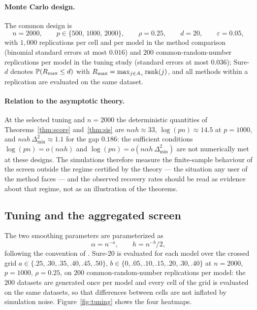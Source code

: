 \paragraph{Monte Carlo design.}
The common design is
\[
 n=2000,\qquad p\in\{500,\,1000,\,2000\},\qquad \rho=0.25,
 \qquad d=20,\qquad \varepsilon=0.05,
\]
with $1{,}000$ replications per cell and per model in the method
comparison (binomial standard errors at most $0.016$) and $200$
common-random-number replications per model in the tuning study
(standard errors at most $0.036$); Sure-$d$ denotes
$\mathbb P(R_{\max}\le d)$ with $R_{\max}=\max_{j\in A_\gamma}\mathrm{rank}(j)$,
and all methods within a replication are evaluated on the same dataset.

\paragraph{Relation to the asymptotic theory.}
At the selected tuning and $n=2000$ the deterministic quantities of
Theorems~\ref{thm:score} and~\ref{thm:sis} are $n\alpha h\approx33$,
$\log(pn)\approx14.5$ at $p=1000$, and
$n\alpha h\,\Delta_{\min}^2\approx1.1$ for the gap $0.186$: the
sufficient conditions $\log(pn)=o(n\alpha h)$ and
$\log(pn)=o(n\alpha h\,\Delta_{\min}^2)$ are not numerically met at
these designs. The simulations therefore measure the finite-sample
behaviour of the screen outside the regime certified by the theory ---
the situation any user of the method faces --- and the observed
recovery rates should be read as evidence about that regime, not as an
illustration of the theorems.

\subsection{Tuning and the aggregated screen}\label{sec:tuning}

The two smoothing parameters are parameterized as
\[
 \alpha=n^{-a},\qquad h=n^{-b}/2,
\]
following the convention of \citet{gardesPodgorny2025}. Sure-20 is
evaluated for each model over the crossed grid
$a\in\{.25,.30,.35,.40,.45,.50\}$,
$b\in\{0,.05,.10,.15,.20,.30,.40\}$ at $n=2000$, $p=1000$,
$\rho=0.25$, on $200$ common-random-number replications per model: the
$200$ datasets are generated once per model and every cell of the grid
is evaluated on the same datasets, so that differences between cells
are not inflated by simulation noise. Figure~\ref{fig:tuning} shows the
four heatmaps.

